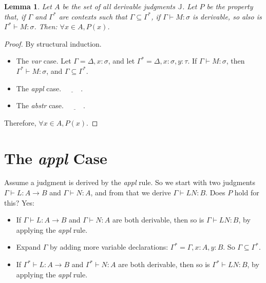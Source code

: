 \documentclass{book}
\numberwithin{equation}{chapter}
\newcommand{\blank}{\underline{\hspace{1cm}}}
\newtheorem*{anon-lemma}{Lemma}
\begin{document}
\begin{anon-lemma}
Let $A$ be the set of all derivable judgments $\mathbb{J}$. Let $P$ be the property that, if $\Gamma$ and $\Gamma^{*}$ are contexts such that $\Gamma \subseteq \Gamma^{*}$, if $\Gamma \vdash M : \sigma$ is derivable, so also is $\Gamma^{*} \vdash M : \sigma$. Then: $\forall x \in A, P(x)$.
\end{anon-lemma}

\begin{proof}
By structural induction.

\begin{itemize}
\item{The \textit{var} case. Let $\Gamma = \Delta, x : \sigma$, and let $\Gamma^{*} = \Delta, x : \sigma, y : \tau$. If $\Gamma \vdash M : \sigma$, then $\Gamma^{*} \vdash M : \sigma$, and $\Gamma \subseteq \Gamma^{*}$.}
\item{The \textit{appl} case. $\blank$.}
\item{The \textit{abstr} case. $\blank$.}
\end{itemize}

\noindent
Therefore, $\forall x \in A, P(x)$.
\end{proof}

\noindent
\hrulefill
\newline


\section{The \textit{appl} Case}

Assume a judgment is derived by the \textit{appl} rule. So we start with two judgments $\Gamma \vdash L : A \rightarrow B$ and $\Gamma \vdash N : A$, and from that we derive $\Gamma \vdash LN : B$. Does $P$ hold for this? Yes:

\begin{itemize}
\item{If $\Gamma \vdash L : A \rightarrow B$ and $\Gamma \vdash N : A$ are both derivable, then so is $\Gamma \vdash LN : B$, by applying the \textit{appl} rule.}
\item{Expand $\Gamma$ by adding more variable declarations: $\Gamma^{*} = \Gamma, x : A, y : B$. So $\Gamma \subseteq \Gamma^{*}$.}
\item{If $\Gamma^{*} \vdash L : A \rightarrow B$ and $\Gamma^{*} \vdash N : A$ are both derivable, then so is $\Gamma^{*} \vdash LN : B$, by applying the \textit{appl} rule.}
\end{itemize}
\end{document}
